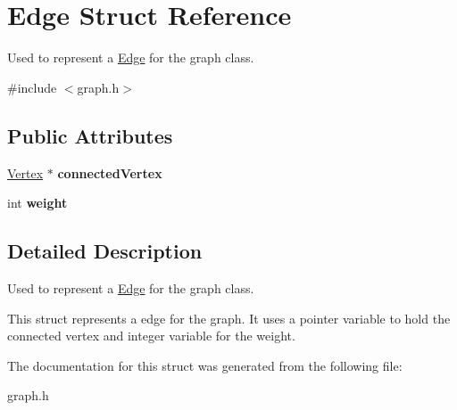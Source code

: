 \hypertarget{struct_edge}{}\section{Edge Struct Reference}
\label{struct_edge}


Used to represent a \hyperlink{struct_edge}{Edge} for the graph class.  




{\ttfamily \#include $<$graph.\+h$>$}

\subsection*{Public Attributes}
\begin{DoxyCompactItemize}
\item 
\mbox{\label{struct_edge_a60f98913cc48bc254567cdb52d592e1c}} 
\hyperlink{struct_vertex}{Vertex} $\ast$ {\bfseries connected\+Vertex}
\item 
\mbox{\label{struct_edge_a4d58e1f4de38fa55549497175981ebab}} 
int {\bfseries weight}
\end{DoxyCompactItemize}


\subsection{Detailed Description}
Used to represent a \hyperlink{struct_edge}{Edge} for the graph class. 

This struct represents a edge for the graph. It uses a pointer variable to hold the connected vertex and integer variable for the weight. 

The documentation for this struct was generated from the following file\+:\begin{DoxyCompactItemize}
\item 
graph.\+h\end{DoxyCompactItemize}
